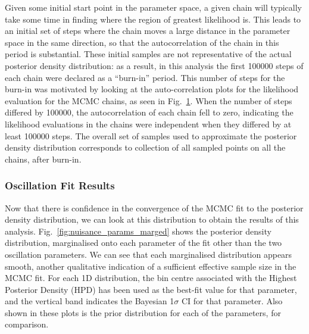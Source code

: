 Given some initial start point in the parameter space, a given chain will typically take some time in finding where the region of greatest likelihood is. This leads to an initial set of steps where the chain moves a large distance in the parameter space in the same direction, so that the autocorrelation of the chain in this period is substantial. These initial samples are not representative of the actual posterior density distribution: as a result, in this analysis the first \num{100000} steps of each chain were declared as a ``burn-in'' period. This number of steps for the burn-in was motivated by looking at the auto-correlation plots for the likelihood evaluation for the MCMC chains, as seen in Fig.~\ref{fig:auto_corr}. When the number of steps differed by \num{100000}, the autocorrelation of each chain fell to zero, indicating the likelihood evaluations in the chains were independent when they differed by at least \num{100000} steps. The overall set of samples used to approximate the posterior density distribution corresponds to collection of all sampled points on all the chains, after burn-in.

\begin{figure}
    \centering
    \caption[]{}
    \label{fig:auto_corr}
\end{figure}


\subsubsection{Oscillation Fit Results}
Now that there is confidence in the convergence of the MCMC fit to the posterior density distribution, we can look at this distribution to obtain the results of this analysis. Fig.~\ref{fig:nuisance_params_marged} shows the posterior density distribution, marginalised onto each parameter of the fit other than the two oscillation parameters. We can see that each marginalised distribution appears smooth, another qualitative indication of a sufficient effective sample size in the MCMC fit. For each 1D distribution, the bin centre associated with the Highest Posterior Density (HPD) has been used as the best-fit value for that parameter, and the vertical band indicates the Bayesian 1$\sigma$ CI for that parameter. Also shown in these plots is the prior distribution for each of the parameters, for comparison.

